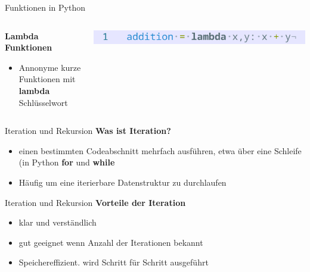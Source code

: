 \documentclass[aspectratio=169]{beamer}
\begin{document}
\begin{frame}{Funktionen in Python}
    \begin{columns}
        \begin{column}{0.5\textwidth}
            \textbf{Lambda Funktionen}
            \begin{itemize}
                \item Annonyme kurze Funktionen mit \textbf{lambda} Schlüsselwort
            \end{itemize}
        \end{column}
        \begin{column}{0.5\textwidth}
            \begin{tcolorbox}[colframe=oxfordblue, colback=blue!10, coltitle=white, title=Python]
                \includegraphics[width=\textwidth]{images/code_lambdafunction.png}
            \end{tcolorbox}
        \end{column}
    \end{columns}
\end{frame}

\begin{frame}{Iteration und Rekursion}
    \textbf{Was ist Iteration?}
    \begin{itemize}
        \item einen bestimmten Codeabschnitt mehrfach ausführen, etwa über eine Schleife (in Python \textbf{for} und \textbf{while}
        \item Häufig um eine iterierbare Datenstruktur zu durchlaufen
    \end{itemize}
\end{frame}

\begin{frame}{Iteration und Rekursion}
    \textbf{Vorteile der Iteration}
    \begin{itemize}
        \item klar und verständlich
        \item gut geeignet wenn Anzahl der Iterationen bekannt
        \item Speichereffizient. wird Schritt für Schritt ausgeführt
    \end{itemize}
\end{frame}
\end{document}
